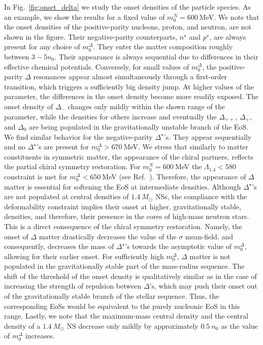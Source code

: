 \documentclass[preprint,showkeys,lengthcheck,nofootinbib,twocolumn,notitlepage,floatfix,superscriptaddress]{revtex4-1}
\begin{document}
In Fig.~\ref{fig:onset_delta} we study the onset densities of the particle species. As an example, we show the results for a fixed value of $m_0^N=600~$MeV. We note that the onset densities of the positive-parity nucleons, proton, and neutron, are not shown in the figure. Their negative-parity counterparts, $n^\star$ and $p^\star$, are always present for any choice of $m_0^\Delta$. They enter the matter composition roughly between $3-5n_0$. Their appearance is always sequential due to differences in their effective chemical potentials. Conversely, for small values of $m_0^\Delta$, the positive-parity $\Delta$ resonances appear almost simultaneously through a first-order transition, which triggers a sufficiently big density jump. At higher values of the parameter, the differences in the onset density become more readily exposed. The onset density of $\Delta_-$ changes only mildly within the shown range of the parameter, while the densities for others increase and eventually the $\Delta_{++}$, $\Delta_+$, and $\Delta_0$ are being populated in the gravitationally unstable branch of the EoS. We find similar behavior for the negative-parity $\Delta^\star$'s. They appear sequentially and no $\Delta^\star$'s are present for $m_0^\Delta > 670~$MeV. We stress that similarly to matter constituents in symmetric matter, the appearance of the chiral partners, reflects the partial chiral symmetry restoration. For $m_0^N=600~$MeV the $\Lambda_{1.4}<580$ constraint is met for $m_0^\Delta<650~$MeV (see Ref.~\cite{Marczenko:2021uaj}). Therefore, the appearance of $\Delta$ matter is essential for softening the EoS at intermediate densities. Although $\Delta^\star$'s are not populated at central densities of $1.4~M_\odot$ NSs, the compliance with the deformability constraint implies their onset at higher, gravitationally stable, densities,  and therefore, their presence in the cores of high-mass neutron stars. This is a direct consequence of the chiral symmetry restoration. Namely, the onset of $\Delta$ matter drastically decreases the value of the $\sigma$ mean-field,  and consequently, decreases the mass of $\Delta^\star$'s towards the asymptotic value of $m_0^\Delta$, allowing for their earlier onset. For sufficiently high $m_0^\Delta$, $\Delta$ matter is not populated in the gravitationally stable part of the mass-radius sequence. The shift of the threshold of the onset density is qualitatively similar as in the case of increasing the strength of repulsion between $\Delta$'s, which may push their onset out of the gravitationally stable branch of the stellar sequence. Thus, the corresponding EoSs would be equivalent to the purely nucleonic EoS in this range. Lastly, we note that the maximum-mass central density and the central density of a $1.4~M_\odot$ NS decrease only mildly by approximately $0.5~n_0$ as the value of $m_0^\Delta$ increases.
\end{document}
